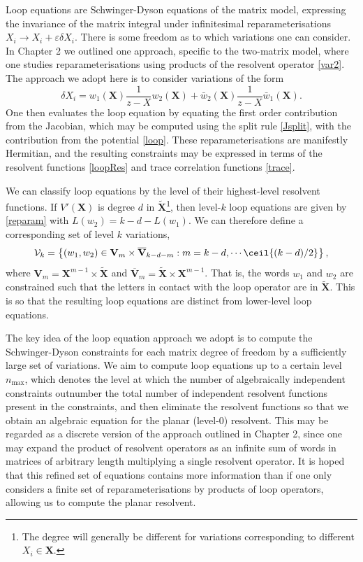 Loop equations are Schwinger-Dyson equations of the matrix model, expressing the invariance of the
matrix integral under infinitesimal reparameterisations $X_i \rightarrow X_i + \varepsilon \delta
    X_i$. There is some freedom as to which variations one can consider. In Chapter 2 we outlined one
approach, specific to the two-matrix model, where one studies reparameterisations using products of
the resolvent operator \eqref{var2}. The approach we adopt here is to consider variations of the
form
%
\begin{equation}
    \label{reparam}
    \delta X_i = w_1(\mathbf{X}) \frac{1}{z-X} w_2(\mathbf{X}) + \bar{w}_2(\mathbf{X})\frac{1}{z-X}\bar{w}_1(\mathbf{X}).
\end{equation}
%
One then evaluates the loop equation by equating the first order contribution from the Jacobian,
which may be computed using the split rule \eqref{Jsplit}, with the contribution from the potential
\eqref{loop}. These reparameterisations are manifestly Hermitian, and the resulting constraints may
be expressed in terms of the resolvent functions \eqref{loopRes} and trace correlation functions
\eqref{trace}.

We can classify loop equations by the level of their highest-level resolvent functions. If
$V'(\mathbf{X})$ is degree $d$ in $\tilde{\mathbf{X}}$\footnote{The degree will generally be
    different for variations corresponding to different $X_i\in\mathbf{X}$.}, then level-$k$ loop
equations are given by \eqref{reparam} with $L(w_2)=k-d-L(w_1)$. We can therefore define a
corresponding set of level $k$ variations,
%
\begin{equation}
    \label{var}
    \mathcal{V}_k = \left\{ (w_1,w_2)\in\mathbf{V}_m\times\overline{\mathbf{V}}_{k-d-m} : m=k-d,\cdots \ceil{(k-d)/2} \right\},
\end{equation}
%
where $\mathbf{V}_m=\mathbf{X}^{m-1}\times \tilde{\mathbf{X}}$ and $\overline{\mathbf{V}}_m =
    \tilde{\mathbf{X}}\times\mathbf{X}^{m-1}$. That is, the words $w_1$ and $w_2$ are constrained such
that the letters in contact with the loop operator are in $\tilde{\mathbf{X}}$. This is so that the
resulting loop equations are distinct from lower-level loop equations.

The key idea of the loop equation approach we adopt is to compute the Schwinger-Dyson constraints
for each matrix degree of freedom by a sufficiently large set of variations. We aim to compute loop
equations up to a certain level $n_{\text{max}}$, which denotes the level at which the number of
algebraically independent constraints outnumber the total number of independent resolvent functions
present in the constraints, and then eliminate the resolvent functions so that we obtain an
algebraic equation for the planar (level-0) resolvent. This may be regarded as a discrete version
of the approach outlined in Chapter 2, since one may expand the product of resolvent operators as
an infinite sum of words in matrices of arbitrary length multiplying a single resolvent operator.
It is hoped that this refined set of equations contains more information than if one only considers
a finite set of reparameterisations by products of loop operators, allowing us to compute the
planar resolvent.

